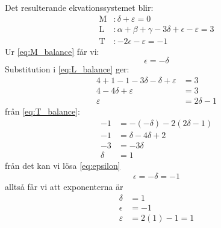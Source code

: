 \documentclass[a4paper,12pt]{article}
\begin{document}
%
Det resulterande ekvationssystemet blir:
\begin{align}
    \mathrm{M}&: \delta + \varepsilon = 0 \label{eq:M_balance} \\
    \mathrm{L}&: \alpha + \beta + \gamma - 3\delta + \epsilon - \varepsilon = 3 \label{eq:L_balance} \\
    \mathrm{T}&: -2\epsilon - \varepsilon = -1 \label{eq:T_balance}
\end{align}
%
Ur \cref{eq:M_balance} får vi:
\begin{equation}
    \epsilon = -\delta \label{eq:epsilon}
\end{equation}
%
Substitution i \cref{eq:L_balance} ger:
\begin{align}
    4 + 1 - 1 - 3\delta - \delta + \varepsilon &= 3 \\
    4 - 4\delta + \varepsilon &= 3 \\
    \varepsilon &= 2\delta - 1
\end{align}
%
från \cref{eq:T_balance}:
\begin{align}
    -1 &= -(-\delta) - 2(2\delta - 1) \\
    -1 &= \delta - 4\delta + 2 \\
    -3 &= -3\delta \\
    \delta &= 1
\end{align}
%
från det kan vi lösa \cref{eq:epsilon}
\begin{align}
    \epsilon = -\delta = -1
\end{align}
alltså får vi att exponenterna är
\begin{align}
    \delta &= 1 \\
    \epsilon &= -1 \\
    \varepsilon &= 2(1) - 1 = 1
\end{align}
%
\end{document}
